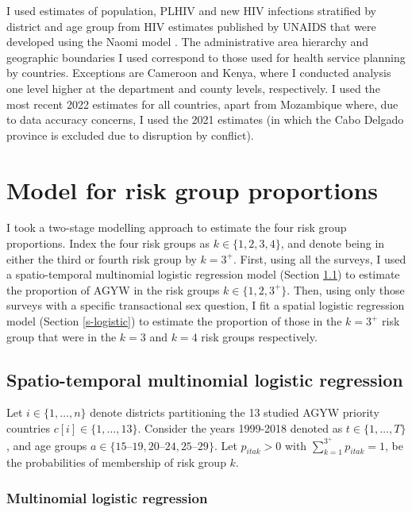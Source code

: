 \documentclass[a4paper, nobind]{templates/ociamthesis}
\begin{document}
I used estimates of population, PLHIV and new HIV infections stratified by district and age group from HIV estimates published by UNAIDS that were developed using the Naomi model \autocite{eaton2021naomi}.
The administrative area hierarchy and geographic boundaries I used correspond to those used for health service planning by countries.
Exceptions are Cameroon and Kenya, where I conducted analysis one level higher at the department and county levels, respectively.
I used the most recent 2022 estimates for all countries, apart from Mozambique where, due to data accuracy concerns, I used the 2021 estimates (in which the Cabo Delgado province is excluded due to disruption by conflict).

\hypertarget{model-for-risk-group-proportions}{%
\section{Model for risk group proportions}\label{model-for-risk-group-proportions}}

I took a two-stage modelling approach to estimate the four risk group proportions.
Index the four risk groups as \(k \in \{1, 2, 3, 4\}\), and denote being in either the third or fourth risk group by \(k = 3^{+}\).
First, using all the surveys, I used a spatio-temporal multinomial logistic regression model (Section \ref{st-multinomial}) to estimate the proportion of AGYW in the risk groups \(k \in \{1, 2, 3^{+}\}\).
Then, using only those surveys with a specific transactional sex question, I fit a spatial logistic regression model (Section \ref{s-logistic}) to estimate the proportion of those in the \(k = 3^{+}\) risk group that were in the \(k = 3\) and \(k = 4\) risk groups respectively.

\hypertarget{st-multinomial}{%
\subsection{Spatio-temporal multinomial logistic regression}\label{st-multinomial}}

Let \(i \in \{1, \ldots, n\}\) denote districts partitioning the 13 studied AGYW priority countries \(c[i] \in \{1, \ldots, 13\}\).
Consider the years 1999-2018 denoted as \(t \in \{1, \ldots, T\}\), and age groups \(a \in \{\text{15--19}, \text{20--24}, \text{25--29}\}\).
Let \(p_{itak} > 0\) with \(\sum_{k = 1}^{3^{+}} p_{itak} = 1\), be the probabilities of membership of risk group \(k\).

\hypertarget{multinomial-logistic-regression}{%
\subsubsection{Multinomial logistic regression}\label{multinomial-logistic-regression}}
\end{document}

